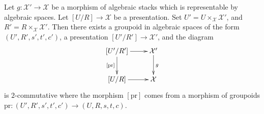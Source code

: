 \begin{lemma}
\label{lemma-representable-in-terms-presentations}
Let $g : \mathcal{X}' \to \mathcal{X}$ be a morphism of algebraic stacks
which is representable by algebraic spaces. Let $[U/R] \to \mathcal{X}$
be a presentation. Set $U' = U \times_{\mathcal{X}} \mathcal{X}'$,
and $R' = R \times_{\mathcal{X}} \mathcal{X}'$.
Then there exists a groupoid in algebraic spaces of the form
$(U', R', s', t', c')$, a presentation $[U'/R'] \to \mathcal{X}'$,
and the diagram
$$
\xymatrix{
[U'/R'] \ar[d]_{[\text{pr}]} \ar[r] & \mathcal{X}' \ar[d]^g \\
[U/R] \ar[r] & \mathcal{X}
}
$$
is $2$-commutative where the morphism $[\text{pr}]$ comes from a
morphism of groupoids
$\text{pr} : (U', R', s', t', c') \to (U, R, s, t, c)$.
\end{lemma}

